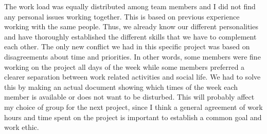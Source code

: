 The work load was equally distributed among team members and I did not find any personal issues working together. This is based on previous experience working with the same people. Thus, we already know our different personalities and have thoroughly established the different skills that we have to complement each other. The only new conflict we had in this specific project was based on disagreements about time and priorities. In other words, some members were fine working on the project all days of the week while some members preferred a clearer separation between work related activities and social life. We had to solve this by making an actual document showing which times of the week each member is available or does not want to be disturbed. This will probably affect my choice of group for the next project, since I think a general agreement of work hours and time spent on the project is important to establish a common goal and work ethic. 

